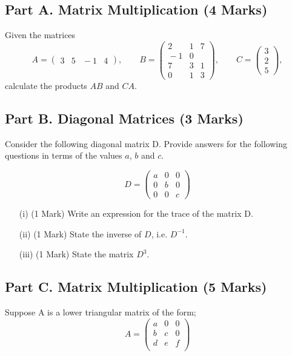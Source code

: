 \documentclass[a4paper,12pt]{article}
\begin{document}
	\subsection*{Part A. Matrix Multiplication (4 Marks)}	
	Given the matrices 
	$$
	A=\left(\begin{array}{cccc} 
	3&5&\!\!\!-1&4\end{array}
	\right), \qquad
	B =\left(\begin{array}{ccc} 
	2&1&7\\ \!\!\!-1&0\\7&3&1\\0&1&3\end{array}
	\right), \qquad
	C=\left(\begin{array}{c} 3\\2\\ 5\end{array}
	\right),
	$$
	calculate the products $AB$ and $CA$.
	\subsection*{Part B. Diagonal Matrices (3 Marks)}	
	Consider the following diagonal matrix D. Provide answers for the following questions in terms of the values $a$, $b$ and $c$.
	
	
	\[D = \left(\begin{array}{ccc}
		a & 0 & 0 \\ 
		0 & b & 0 \\ 
		0 & 0 & c
	\end{array} \right)\]
	\begin{itemize}
		\item[(i)] (1 Mark) Write an expression for the trace of the matrix D.
		\item[(ii)] (1 Mark) State the inverse of $D$, i.e. $D^{-1}$.
		\item[(iii)] (1 Mark) State the matrix $D^3$.
	\end{itemize}
	\smallskip
	\subsection*{Part C. Matrix Multiplication (5 Marks)}	
		Suppose A is a lower triangular matrix of the form;
		\[A = \left(
		\begin{matrix}
		a & 0 & 0 \\
		b & c & 0 \\
		d & e & f \\
		\end{matrix} \right)
		\]
		
\end{document}
